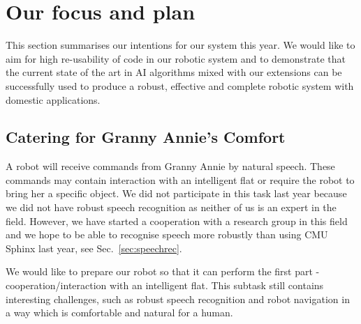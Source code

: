  
\section{Our focus and plan}

This section summarises our intentions for our system this year. We would like to aim for high re-usability of code in our robotic system and to demonstrate that the current state of the art in AI algorithms mixed with our extensions can be successfully used to produce a robust, effective and complete robotic system with domestic applications.  

\subsection{Catering for Granny Annie’s Comfort}

A robot will receive commands from Granny Annie by natural speech. These commands may contain interaction with an intelligent flat or require the robot to bring her a specific object. 
We did not participate in this task last year because we did not have robust speech recognition as neither of us is an expert in the field. 
However, we have started a cooperation with a research group in this field and we hope to be able to recognise speech more robustly than using CMU Sphinx last year, see Sec.~\ref{sec:speechrec}.

We would like to prepare our robot so that it can perform the first part - cooperation/interaction with an intelligent flat. This subtask still contains interesting challenges, such as robust speech recognition and robot navigation in a way which is comfortable and natural for a human.  





